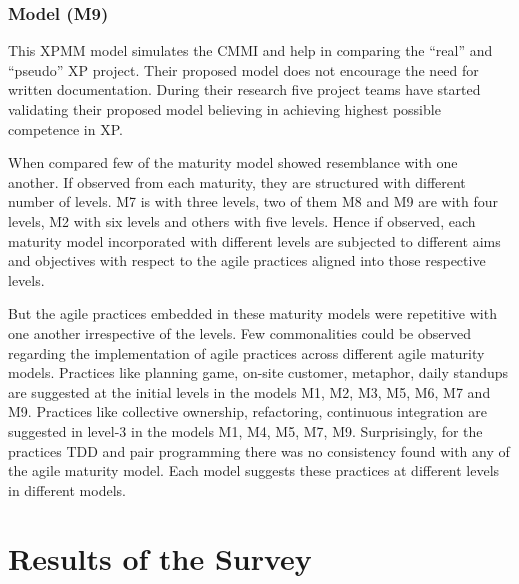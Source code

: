 \documentclass[a4paper,oneside]{bth}
\begin{document}
\subsubsection{Model (M9)}
This XPMM model simulates the CMMI and help in comparing the “real” and “pseudo” XP project. Their proposed model does not encourage the need for written documentation. During their research five project teams have started validating their proposed model believing in achieving highest possible competence in XP.

When compared few of the maturity model showed resemblance with one another. If observed from each maturity, they are structured with different number of levels. M7 is with three levels, two of them M8 and M9 are with four levels, M2 with six levels and others with five levels. Hence if observed, each maturity model incorporated with different levels are subjected to different aims and objectives with respect to the agile practices aligned into those respective levels.

But the agile practices embedded in these maturity models were repetitive with one another irrespective of the levels. Few commonalities could be observed regarding the implementation of agile practices across different agile maturity models. Practices like planning game, on-site customer, metaphor, daily standups are suggested at the initial levels in the models M1, M2, M3, M5, M6, M7 and M9. Practices like collective ownership, refactoring, continuous integration are suggested in level-3 in the models M1, M4, M5, M7, M9. Surprisingly, for the practices TDD and pair programming there was no consistency found with any of the agile maturity model. Each model suggests these practices at different levels in different models.
\section{Results of the Survey}
\end{document}
